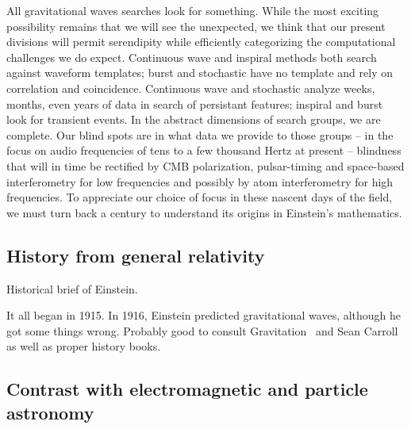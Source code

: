All gravitational waves searches look for something. While the most exciting possibility remains that we will see the unexpected, we think that our present divisions will permit serendipity while efficiently categorizing the computational challenges we do expect. Continuous wave and inspiral methods both search against waveform templates; burst and stochastic have no template and rely on correlation and coincidence. Continuous wave and stochastic analyze weeks, months, even years of data in search of persistant features; inspiral and burst look for transient events. In the abstract dimensions of search groups, we are complete. Our blind spots are in what data we provide to those groups -- in the focus on audio frequencies of tens to a few thousand Hertz at present -- blindness that will in time be rectified by CMB polarization, pulsar-timing and space-based interferometry for low frequencies and possibly by atom interferometry for high frequencies. To appreciate our choice of focus in these nascent days of the field, we must turn back a century to understand its origins in Einstein's mathematics.

        \subsection{History from general relativity}
        \label{history_GR}

            Historical brief of Einstein.

		It all began in 1915. In 1916, Einstein predicted gravitational waves, although he got some things wrong. Probably good to consult Gravitation~\cite{MisnerThorneWheeler} and Sean Carroll~\cite{Carroll1997} as well as proper history books. 
 
        \subsection{Contrast with electromagnetic and particle astronomy}
        \label{contrast_astro}

